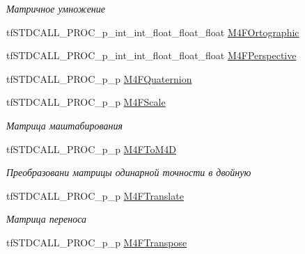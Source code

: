 \begin{DoxyCompactItemize}
\begin{DoxyCompactList}\small\item\em Матричное умножение \end{DoxyCompactList}\item 
tf\-S\-T\-D\-C\-A\-L\-L\-\_\-\-P\-R\-O\-C\-\_\-p\-\_\-int\-\_\-int\-\_\-float\-\_\-float\-\_\-float \hyperlink{structs_functions_vector_c_p_u_ab892a354203795113ad193a45ad5a5bf}{M4\-F\-Ortographic}
\item 
tf\-S\-T\-D\-C\-A\-L\-L\-\_\-\-P\-R\-O\-C\-\_\-p\-\_\-int\-\_\-int\-\_\-float\-\_\-float\-\_\-float \hyperlink{structs_functions_vector_c_p_u_a58ea6e7fa96cec5ae6f4271cdaf7a3fd}{M4\-F\-Perspective}
\item 
tf\-S\-T\-D\-C\-A\-L\-L\-\_\-\-P\-R\-O\-C\-\_\-p\-\_\-p \hyperlink{structs_functions_vector_c_p_u_ae5283c1e85c3adb32991a0b4487d3bc7}{M4\-F\-Quaternion}
\item 
\hypertarget{structs_functions_vector_c_p_u_a470c204cf10e7934c5ce82a76d9b41c0}{tf\-S\-T\-D\-C\-A\-L\-L\-\_\-\-P\-R\-O\-C\-\_\-p\-\_\-p \hyperlink{structs_functions_vector_c_p_u_a470c204cf10e7934c5ce82a76d9b41c0}{M4\-F\-Scale}}\label{structs_functions_vector_c_p_u_a470c204cf10e7934c5ce82a76d9b41c0}

\begin{DoxyCompactList}\small\item\em Матрица маштабирования \end{DoxyCompactList}\item 
\hypertarget{structs_functions_vector_c_p_u_a896041349778f179bad5feea12951c3e}{tf\-S\-T\-D\-C\-A\-L\-L\-\_\-\-P\-R\-O\-C\-\_\-p\-\_\-p \hyperlink{structs_functions_vector_c_p_u_a896041349778f179bad5feea12951c3e}{M4\-F\-To\-M4\-D}}\label{structs_functions_vector_c_p_u_a896041349778f179bad5feea12951c3e}

\begin{DoxyCompactList}\small\item\em Преобразовани матрицы одинарной точности в двойную \end{DoxyCompactList}\item 
\hypertarget{structs_functions_vector_c_p_u_a96a15f5950c04ee7da9dd9bec465aae7}{tf\-S\-T\-D\-C\-A\-L\-L\-\_\-\-P\-R\-O\-C\-\_\-p\-\_\-p \hyperlink{structs_functions_vector_c_p_u_a96a15f5950c04ee7da9dd9bec465aae7}{M4\-F\-Translate}}\label{structs_functions_vector_c_p_u_a96a15f5950c04ee7da9dd9bec465aae7}

\begin{DoxyCompactList}\small\item\em Матрица переноса \end{DoxyCompactList}\item 
\hypertarget{structs_functions_vector_c_p_u_a49b61240d22124b7fa6c98928979f0cd}{tf\-S\-T\-D\-C\-A\-L\-L\-\_\-\-P\-R\-O\-C\-\_\-p\-\_\-p \hyperlink{structs_functions_vector_c_p_u_a49b61240d22124b7fa6c98928979f0cd}{M4\-F\-Transpose}}\label{structs_functions_vector_c_p_u_a49b61240d22124b7fa6c98928979f0cd}


\end{DoxyCompactItemize}
